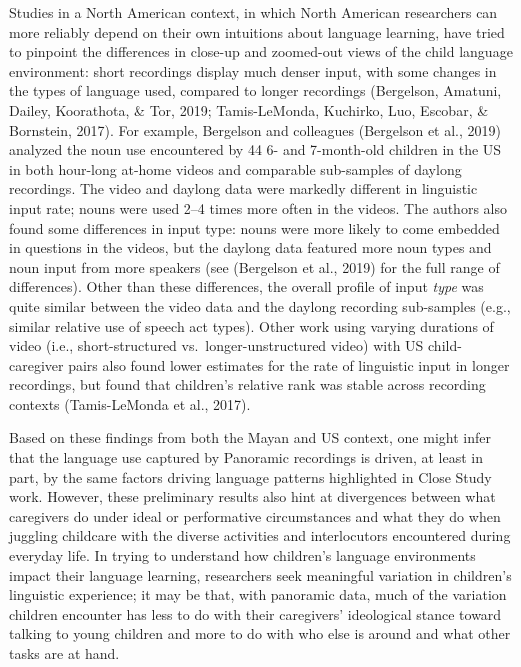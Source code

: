 \documentclass[,man,floatsintext]{apa6}
\begin{document}
Studies in a North American context, in which North American researchers
can more reliably depend on their own intuitions about language
learning, have tried to pinpoint the differences in close-up and
zoomed-out views of the child language environment: short recordings
display much denser input, with some changes in the types of language
used, compared to longer recordings (Bergelson, Amatuni, Dailey,
Koorathota, \& Tor, 2019; Tamis-LeMonda, Kuchirko, Luo, Escobar, \&
Bornstein, 2017). For example, Bergelson and colleagues (Bergelson et
al., 2019) analyzed the noun use encountered by 44 6- and 7-month-old
children in the US in both hour-long at-home videos and comparable
sub-samples of daylong recordings. The video and daylong data were
markedly different in linguistic input rate; nouns were used 2--4 times
more often in the videos. The authors also found some differences in
input type: nouns were more likely to come embedded in questions in the
videos, but the daylong data featured more noun types and noun input
from more speakers (see (Bergelson et al., 2019) for the full range of
differences). Other than these differences, the overall profile of input
\emph{type} was quite similar between the video data and the daylong
recording sub-samples (e.g., similar relative use of speech act types).
Other work using varying durations of video (i.e., short-structured
vs.~longer-unstructured video) with US child-caregiver pairs also found
lower estimates for the rate of linguistic input in longer recordings,
but found that children's relative rank was stable across recording
contexts (Tamis-LeMonda et al., 2017).

Based on these findings from both the Mayan and US context, one might
infer that the language use captured by Panoramic recordings is driven,
at least in part, by the same factors driving language patterns
highlighted in Close Study work. However, these preliminary results also
hint at divergences between what caregivers do under ideal or
performative circumstances and what they do when juggling childcare with
the diverse activities and interlocutors encountered during everyday
life. In trying to understand how children's language environments
impact their language learning, researchers seek meaningful variation in
children's linguistic experience; it may be that, with panoramic data,
much of the variation children encounter has less to do with their
caregivers' ideological stance toward talking to young children and more
to do with who else is around and what other tasks are at hand.
\end{document}
